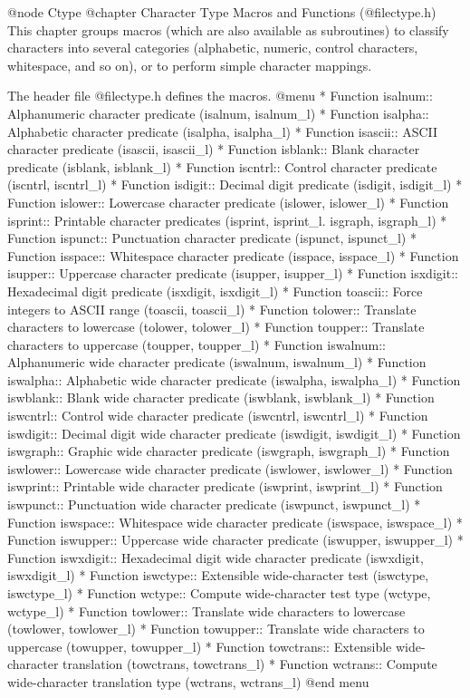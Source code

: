 @node Ctype
@chapter Character Type Macros and Functions (@file{ctype.h})
This chapter groups macros (which are also available as subroutines)
to classify characters into several categories (alphabetic,
numeric, control characters, whitespace, and so on), or to perform
simple character mappings.

The header file @file{ctype.h} defines the macros.
@menu
* Function isalnum::   Alphanumeric character predicate (isalnum, isalnum_l)
* Function isalpha::   Alphabetic character predicate (isalpha, isalpha_l)
* Function isascii::   ASCII character predicate (isascii, isascii_l)
* Function isblank::   Blank character predicate (isblank, isblank_l)
* Function iscntrl::   Control character predicate (iscntrl, iscntrl_l)
* Function isdigit::   Decimal digit predicate (isdigit, isdigit_l)
* Function islower::   Lowercase character predicate (islower, islower_l)
* Function isprint::   Printable character predicates (isprint, isprint_l. isgraph, isgraph_l)
* Function ispunct::   Punctuation character predicate (ispunct, ispunct_l)
* Function isspace::   Whitespace character predicate (isspace, isspace_l)
* Function isupper::   Uppercase character predicate (isupper, isupper_l)
* Function isxdigit::  Hexadecimal digit predicate (isxdigit, isxdigit_l)
* Function toascii::   Force integers to ASCII range (toascii, toascii_l)
* Function tolower::   Translate characters to lowercase (tolower, tolower_l)
* Function toupper::   Translate characters to uppercase (toupper, toupper_l)
* Function iswalnum::  Alphanumeric wide character predicate (iswalnum, iswalnum_l)
* Function iswalpha::  Alphabetic wide character predicate (iswalpha, iswalpha_l)
* Function iswblank::  Blank wide character predicate (iswblank, iswblank_l)
* Function iswcntrl::  Control wide character predicate (iswcntrl, iswcntrl_l)
* Function iswdigit::  Decimal digit wide character predicate (iswdigit, iswdigit_l)
* Function iswgraph::  Graphic wide character predicate (iswgraph, iswgraph_l)
* Function iswlower::  Lowercase wide character predicate (iswlower, iswlower_l)
* Function iswprint::  Printable wide character predicate (iswprint, iswprint_l)
* Function iswpunct::  Punctuation wide character predicate (iswpunct, iswpunct_l)
* Function iswspace::  Whitespace wide character predicate (iswspace, iswspace_l)
* Function iswupper::  Uppercase wide character predicate (iswupper, iswupper_l)
* Function iswxdigit:: Hexadecimal digit wide character predicate (iswxdigit, iswxdigit_l)
* Function iswctype::  Extensible wide-character test (iswctype, iswctype_l)
* Function wctype::    Compute wide-character test type (wctype, wctype_l)
* Function towlower::  Translate wide characters to lowercase (towlower, towlower_l)
* Function towupper::  Translate wide characters to uppercase (towupper, towupper_l)
* Function towctrans:: Extensible wide-character translation (towctrans, towctrans_l)
* Function wctrans::   Compute wide-character translation type (wctrans, wctrans_l)
@end menu

